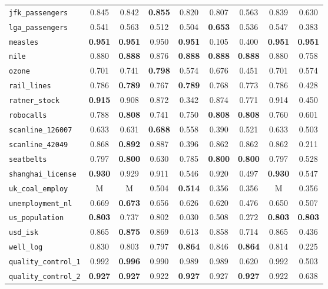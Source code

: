 \begin{tabular}{lcccccccc}
\verb+jfk_passengers+ & 0.845 & 0.842 & \textbf{0.855} & 0.820 & 0.807 & 0.563 & 0.839 & 0.630\\
\verb+lga_passengers+ & 0.541 & 0.563 & 0.512 & 0.504 & \textbf{0.653} & 0.536 & 0.547 & 0.383\\
\verb+measles+ & \textbf{0.951} & \textbf{0.951} & 0.950 & \textbf{0.951} & 0.105 & 0.400 & \textbf{0.951} & \textbf{0.951}\\
\verb+nile+ & 0.880 & \textbf{0.888} & 0.876 & \textbf{0.888} & \textbf{0.888} & \textbf{0.888} & 0.880 & 0.758\\
\verb+ozone+ & 0.701 & 0.741 & \textbf{0.798} & 0.574 & 0.676 & 0.451 & 0.701 & 0.574\\
\verb+rail_lines+ & 0.786 & \textbf{0.789} & 0.767 & \textbf{0.789} & 0.768 & 0.773 & 0.786 & 0.428\\
\verb+ratner_stock+ & \textbf{0.915} & 0.908 & 0.872 & 0.342 & 0.874 & 0.771 & 0.914 & 0.450\\
\verb+robocalls+ & 0.788 & \textbf{0.808} & 0.741 & 0.750 & \textbf{0.808} & \textbf{0.808} & 0.760 & 0.601\\
\verb+scanline_126007+ & 0.633 & 0.631 & \textbf{0.688} & 0.558 & 0.390 & 0.521 & 0.633 & 0.503\\
\verb+scanline_42049+ & 0.868 & \textbf{0.892} & 0.887 & 0.396 & 0.862 & 0.862 & 0.862 & 0.211\\
\verb+seatbelts+ & 0.797 & \textbf{0.800} & 0.630 & 0.785 & \textbf{0.800} & \textbf{0.800} & 0.797 & 0.528\\
\verb+shanghai_license+ & \textbf{0.930} & 0.929 & 0.911 & 0.546 & 0.920 & 0.497 & \textbf{0.930} & 0.547\\
\verb+uk_coal_employ+ & M & M & 0.504 & \textbf{0.514} & 0.356 & 0.356 & M & 0.356\\
\verb+unemployment_nl+ & 0.669 & \textbf{0.673} & 0.656 & 0.626 & 0.620 & 0.476 & 0.650 & 0.507\\
\verb+us_population+ & \textbf{0.803} & 0.737 & 0.802 & 0.030 & 0.508 & 0.272 & \textbf{0.803} & \textbf{0.803}\\
\verb+usd_isk+ & 0.865 & \textbf{0.875} & 0.869 & 0.613 & 0.858 & 0.714 & 0.865 & 0.436\\
\verb+well_log+ & 0.830 & 0.803 & 0.797 & \textbf{0.864} & 0.846 & \textbf{0.864} & 0.814 & 0.225\\
\midrule
\verb+quality_control_1+ & 0.992 & \textbf{0.996} & 0.990 & 0.989 & 0.989 & 0.620 & 0.992 & 0.503\\
\verb+quality_control_2+ & \textbf{0.927} & \textbf{0.927} & 0.922 & \textbf{0.927} & 0.927 & \textbf{0.927} & 0.922 & 0.638\\

\end{tabular}

